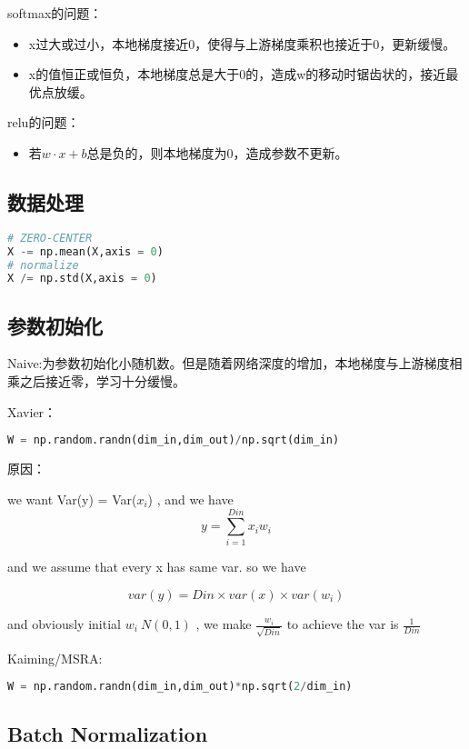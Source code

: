 \documentclass[a4paper]{article}
\begin{document}
softmax的问题：
\begin{itemize}
    \item x过大或过小，本地梯度接近0，使得与上游梯度乘积也接近于0，更新缓慢。
    \item x的值恒正或恒负，本地梯度总是大于0的，造成w的移动时锯齿状的，接近最优点放缓。
    
\end{itemize}

relu的问题：
\begin{itemize}
    \item 若$w\cdot x+b$总是负的，则本地梯度为0，造成参数不更新。
    
\end{itemize}


\subsection{数据处理}
\begin{lstlisting}[language=Python, caption=normalization]
# ZERO-CENTER
X -= np.mean(X,axis = 0)
# normalize
X /= np.std(X,axis = 0)
\end{lstlisting}

\subsection{参数初始化}
Naive:为参数初始化小随机数。但是随着网络深度的增加，本地梯度与上游梯度相乘之后接近零，学习十分缓慢。

Xavier：
\begin{lstlisting}[language=Python, caption=Xavier]
W = np.random.randn(dim_in,dim_out)/np.sqrt(dim_in)
\end{lstlisting}

原因：

we want Var(y) = Var($x_i$) , and we have 
$$y = \sum_{i=1}^{Din} x_i w_i$$

and we assume that  every x has same var. so we have 

$$
var(y) = Din \times var(x) \times var(w_i)
$$

and obviously initial $w_i ~ N(0,1)$ , we make $\frac{w_i}{\sqrt{Din}}$ to achieve the var is $\frac{1}{Din}$

Kaiming/MSRA:
\begin{lstlisting}[language=Python, caption=MSRA]
    W = np.random.randn(dim_in,dim_out)*np.sqrt(2/dim_in)
\end{lstlisting}

\subsection{Batch Normalization}
\end{document}
